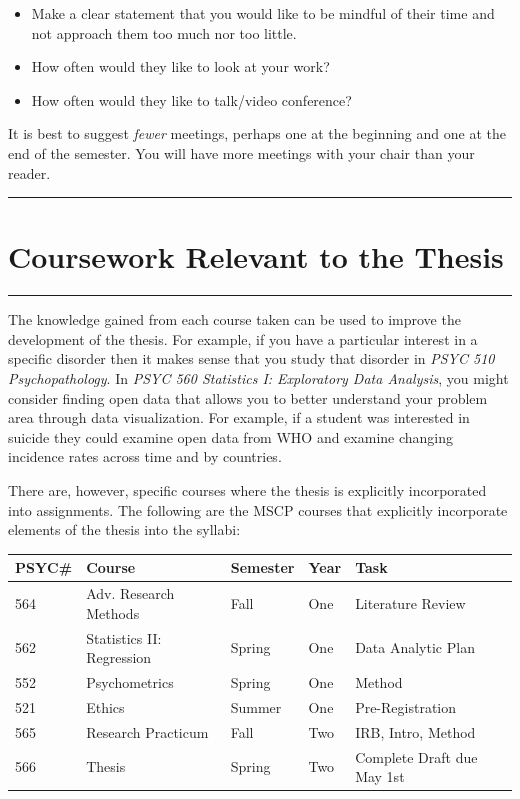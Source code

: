 \documentclass[openany]{book}
\begin{document}
\begin{itemize}
\item
  Make a clear statement that you would like to be mindful of their time and not approach them too much nor too little.
\item
  How often would they like to look at your work?
\item
  How often would they like to talk/video conference?
\end{itemize}

It is best to suggest \emph{fewer} meetings, perhaps one at the beginning and one at the end of the semester. You will have more meetings with your chair than your reader.

\begin{center}\rule{0.5\linewidth}{0.5pt}\end{center}

\hypertarget{coursework-relevant-to-the-thesis}{%
\chapter{Coursework Relevant to the Thesis}\label{coursework-relevant-to-the-thesis}}

\begin{center}\rule{0.5\linewidth}{0.5pt}\end{center}

The knowledge gained from each course taken can be used to improve the development of the thesis. For example, if you have a particular interest in a specific disorder then it makes sense that you study that disorder in \emph{PSYC 510 Psychopathology}. In \emph{PSYC 560 Statistics I: Exploratory Data Analysis}, you might consider finding open data that allows you to better understand your problem area through data visualization. For example, if a student was interested in suicide they could examine open data from WHO and examine changing incidence rates across time and by countries.

There are, however, specific courses where the thesis is explicitly incorporated into assignments. The following are the MSCP courses that explicitly incorporate elements of the thesis into the syllabi:

\begin{longtable}[]{@{}lllll@{}}
\toprule
PSYC\# & Course & Semester & Year & Task\tabularnewline
\midrule
\endhead
564 & Adv. Research Methods & Fall & One & Literature Review\tabularnewline
562 & Statistics II: Regression & Spring & One & Data Analytic Plan\tabularnewline
552 & Psychometrics & Spring & One & Method\tabularnewline
521 & Ethics & Summer & One & Pre-Registration\tabularnewline
565 & Research Practicum & Fall & Two & IRB, Intro, Method\tabularnewline
566 & Thesis & Spring & Two & Complete Draft due May 1st\tabularnewline
\bottomrule
\end{longtable}
\end{document}
